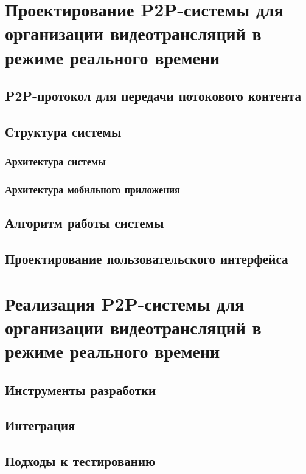 \section{Проектирование P2P-системы для организации видеотрансляций в режиме реального времени}
	\subsection{P2P-протокол для передачи потокового контента}
	\subsection{Структура системы}
		\subsubsection{Архитектура системы}
		\subsubsection{Архитектура мобильного приложения}
	\subsection{Алгоритм работы системы}
	\subsection{Проектирование пользовательского интерфейса}

\section{Реализация P2P-системы для организации видеотрансляций в режиме реального времени}
	\subsection{Инструменты разработки}
	\subsection{Интеграция}
	\subsection{Подходы к тестированию}
